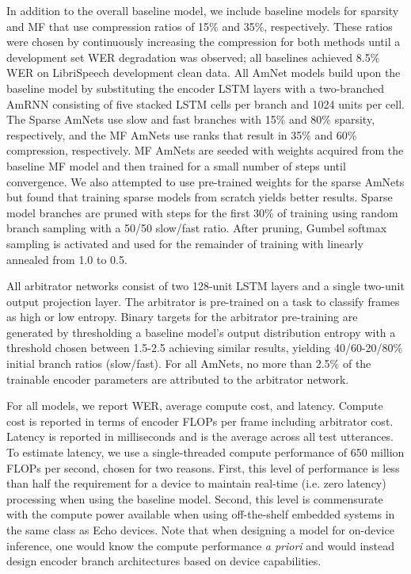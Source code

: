 \documentclass[a4paper]{article}
\begin{document}
In addition to the overall baseline model, we include baseline models for sparsity and MF that use compression ratios of 15\% and 35\%, respectively. 
These ratios were chosen by continuously increasing the compression for both methods until a development set WER degradation was observed; all baselines achieved 8.5\% WER on LibriSpeech development clean data. 
All AmNet models build upon the baseline model by substituting the encoder LSTM layers with a two-branched AmRNN consisting of five stacked LSTM cells per branch and 1024 units per cell. 
The Sparse AmNets use slow and fast branches with 15\% and 80\% sparsity, respectively, and the MF AmNets use ranks that result in 35\% and 60\% compression, respectively. 
MF AmNets are seeded with weights acquired from the baseline MF model and then trained for a small number of steps until convergence. 
We also attempted to use pre-trained weights for the sparse AmNets but found that training sparse models from scratch yields better results. 
Sparse model branches are pruned with  steps for the first 30\% of training using random branch sampling with a 50/50 slow/fast ratio. 
After pruning, Gumbel softmax sampling is activated and used for the remainder of training with  linearly annealed from 1.0 to 0.5. 

All arbitrator networks consist of two 128-unit LSTM layers and a single two-unit output projection layer. The arbitrator is pre-trained on a task to classify frames as high or low entropy. Binary targets for the arbitrator pre-training are generated by thresholding a baseline model's output distribution entropy with a threshold chosen between 1.5-2.5 achieving similar results, yielding 40/60-20/80\% initial branch ratios (slow/fast). For all AmNets, no more than 2.5\% of the trainable encoder parameters are attributed to the arbitrator network.

For all models, we report WER, average compute cost, and latency. Compute cost is reported in terms of encoder FLOPs per frame including arbitrator cost. Latency is reported in milliseconds and is the average across all test utterances. To estimate latency, we use a single-threaded compute performance of 650 million FLOPs per second, chosen for two reasons. First, this level of performance is less than half the requirement for a device to maintain real-time (i.e. zero latency) processing when using the baseline model. Second, this level is commensurate with the compute power available when using off-the-shelf embedded systems in the same class as Echo devices.  Note that when designing a model for on-device inference, one would know the compute performance \emph{a priori} and would instead design encoder branch architectures based on device capabilities.
\end{document}
